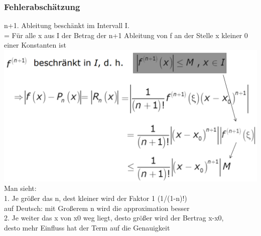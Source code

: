 \documentclass[12pt,a4paper]{article}
\begin{document}
\subsubsection{Fehlerabschätzung}
n+1. Ableitung beschänkt im Intervall I.\\
= Für alle x aus I der Betrag der n+1 Ableitung von f an der Stelle x kleiner 0 einer Konstanten ist\\
\includegraphics[width=1\textwidth]{BIlder/V1/9.png}\\
Man sieht:\\
1. Je größer das n, dest kleiner wird der Faktor 1 (1/(1-n)!)\\
auf Deutsch: mit Großerem n wird die approximation besser\\
2. Je weiter das x von x0 weg liegt, desto größer wird der Bertrag x-x0, \\
desto mehr Einfluss hat der Term auf die Genauigkeit\\
\end{document}
